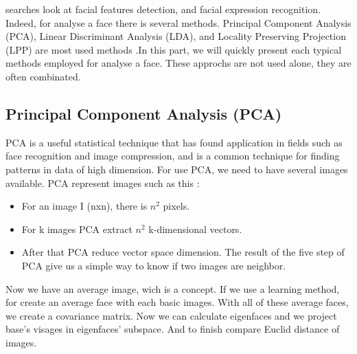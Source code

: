  searches look at facial features detection, and facial expression recognition. Indeed, for analyse a face there is several methods. Principal Component Analysis (PCA), Linear Discriminant Analysis (LDA), and Locality Preserving Projection (LPP) are most used methods \cite{Using-Graph}.In this part, we will quickly present each typical methods employed for analyse a face\cite{Active-Shape}. These approchs are not used alone, they are often combinated.\\
	
	
	\subsection{Principal Component Analysis (PCA)} \leavevmode\par
	PCA is a useful statistical technique that has found application in fields such as face recognition and image compression, and is a common technique for finding patterns in data of high dimension. For use PCA, we need to have several images available. PCA represent images such as this :
		\begin{itemize}
		\item For an image I (nxn), there is $n^{2}$ pixels.
		\item For k images PCA extract $n^{2}$ k-dimensional vectors.	
		\item After that PCA reduce vector space dimension. The result of the five step of PCA give us a simple way to know if two images are neighbor.
		\end{itemize}
	
	Now we have an average image, wich is a concept. If we use a learning method, for create an average face with each basic images. With all of these average faces, we create a covariance matrix. Now we can calculate eigenfaces and we project base's visages in eigenfaces' subspace.
	And to finish compare Euclid distance of images.
		
		
